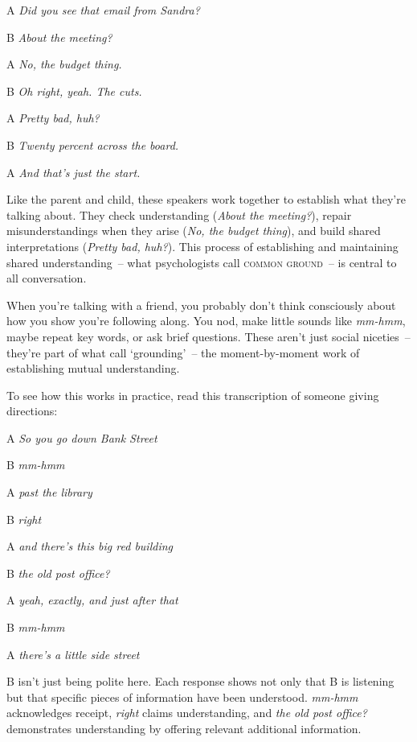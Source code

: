 \ea
\begin{dialogue}
\item[A] \textit{Did you see that email from Sandra?}
\item[B] \textit{About the meeting?}
\item[A] \textit{No, the budget thing.}
\item[B] \textit{Oh right, yeah. The cuts.}
\item[A] \textit{Pretty bad, huh?}
\item[B] \textit{Twenty percent across the board.}
\item[A] \textit{And that's just the start.}
\end{dialogue}
\z
Like the parent and child, these speakers work together to establish what they're talking about. They check understanding (\textit{About the meeting?}), repair misunderstandings when they arise (\textit{No, the budget thing}), and build shared interpretations (\textit{Pretty bad, huh?}). This process of establishing and maintaining shared understanding~-- what psychologists call \textsc{common ground}~-- is central to all conversation.

When you're talking with a friend, you probably don't think consciously about how you show you're following along. You nod, make little sounds like \textit{mm-hmm}, maybe repeat key words, or ask brief questions. These aren't just social niceties~-- they're part of what \citet{clark1991} call `grounding'~-- the moment-by-moment work of establishing mutual understanding.

To see how this works in practice, read this transcription of someone giving directions:

\ea
\begin{dialogue}
\item[A] \textit{So you go down Bank Street}
\item[B] \textit{mm-hmm}
\item[A] \textit{past the library}
\item[B] \textit{right}
\item[A] \textit{and there's this big red building}
\item[B] \textit{the old post office?}
\item[A] \textit{yeah, exactly, and just after that}
\item[B] \textit{mm-hmm}
\item[A] \textit{there's a little side street}
\end{dialogue}
\z
B isn't just being polite here. Each response shows not only that B is listening but that specific pieces of information have been understood. \textit{mm-hmm} acknowledges receipt, \textit{right} claims understanding, and \textit{the old post office?} demonstrates understanding by offering relevant additional information.

